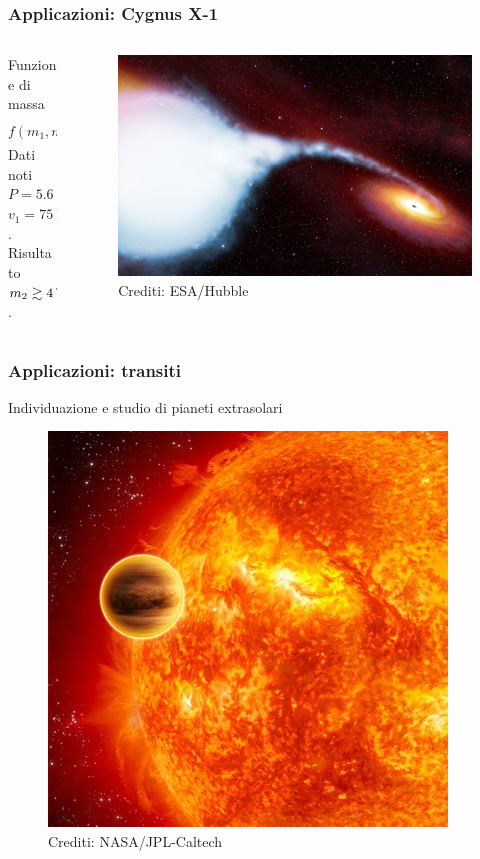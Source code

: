 \documentclass[10pt]{beamer}
\begin{document}
\begin{frame}
  \frametitle{Applicazioni: Cygnus X-1}
  \begin{columns}
    \begin{column}{0.35\columnwidth}
      Funzione di massa
      \begin{equation*}
        f(m_{1},m_{2}) = \frac{v_{1}^{3}P}{2\pi G}
      \end{equation*}
      Dati noti \\
      $P = \SI{5.6}{d},$ \\
      $v_{1} = \SI{75}{\kilo\metre\per\second}$. \\
      Risultato \\
      $m_{2} \gtrsim \SI{4}{\solarmass}$.
    \end{column}
    \begin{column}{0.55\columnwidth}
      \begin{figure}
        \centering
        \includegraphics[width=\columnwidth]{presentazione/cygnusx1}
        \caption{Crediti: ESA/Hubble}
    \end{figure}
    \end{column}
  \end{columns}
\end{frame}

\begin{frame}
  \frametitle{Applicazioni: transiti}
  \begin{adv}
  \item Individuazione e studio di pianeti extrasolari
  \end{adv}
  \begin{figure}
    \centering
    \includegraphics[width=0.5\columnwidth]{presentazione/transit}
    \caption{Crediti: NASA/JPL-Caltech}
  \end{figure}
\end{frame}
\end{document}
